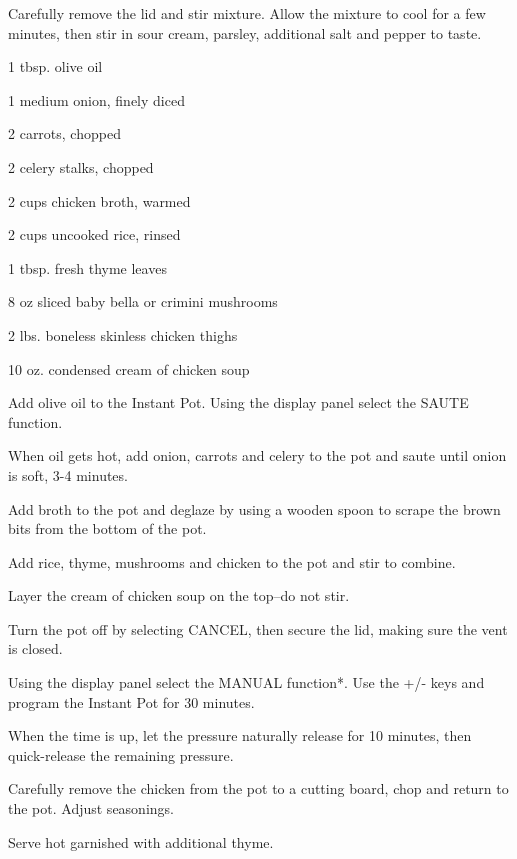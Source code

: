 \documentclass{cookbook}
\begin{document}
Carefully remove the lid and stir mixture. Allow the mixture to cool for a few minutes, then stir in sour cream, parsley, additional salt and pepper to taste.


\begin{ingredients}
    \item 1 tbsp. olive oil
    \item 1 medium onion, finely diced
    \item 2 carrots, chopped
    \item 2 celery stalks, chopped
    \item 2  cups chicken broth, warmed
    \item 2 cups uncooked rice, rinsed
    \item 1 tbsp. fresh thyme leaves
    \item 8 oz sliced baby bella or crimini mushrooms
    \item 2 lbs. boneless skinless chicken thighs
    \item 10 oz. condensed cream of chicken soup
\end{ingredients}

Add olive oil to the Instant Pot. Using the display panel select the SAUTE function.

When oil gets hot, add onion, carrots and celery to the pot and saute until onion is soft, 3-4 minutes.

Add broth to the pot and deglaze by using a wooden spoon to scrape the brown bits from the bottom of the pot.

Add rice, thyme, mushrooms and chicken to the pot and stir to combine.

Layer the cream of chicken soup on the top--do not stir.

Turn the pot off by selecting CANCEL, then secure the lid, making sure the vent is closed.

Using the display panel select the MANUAL function*. Use the +/- keys and program the Instant Pot for 30 minutes.

When the time is up, let the pressure naturally release for 10 minutes, then quick-release the remaining pressure.

Carefully remove the chicken from the pot to a cutting board, chop and return to the pot. Adjust seasonings.

Serve hot garnished with additional thyme.
\end{document}
